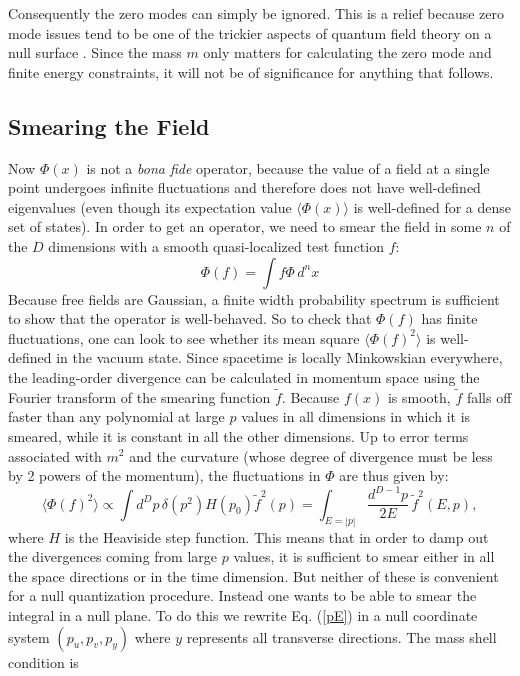 \documentclass[12pt]{article}
\begin{document}
Consequently the zero modes can simply be ignored.  This is a relief because zero mode issues tend to be one of the trickier aspects of quantum field theory on a null surface \cite{burkardt96}.  Since the mass $m$ only matters for calculating the zero mode and finite energy constraints, it will not be of significance for anything that follows.

\subsection{Smearing the Field}\label{smear}

Now $\Phi(x)$ is not a \textit{bona fide} operator, because the value of a field at a single point undergoes infinite fluctuations and therefore does not have well-defined eigenvalues (even though its expectation value $\langle \Phi(x) \rangle$ is well-defined for a dense set of states).  In order to get an operator, we need to smear the field in some $n$ of the $D$ dimensions with a smooth quasi-localized test function $f$:
\begin{equation}
\Phi(f) = \int f \Phi\,d^n x
\end{equation}
Because free fields are Gaussian, a finite width probability spectrum is sufficient to show that the operator is well-behaved.  So to check that $\Phi(f)$ has finite fluctuations, one can look to see whether its mean square $\langle \Phi(f)^2 \rangle$ is well-defined in the vacuum state.  Since spacetime is locally Minkowskian everywhere, the leading-order divergence can be calculated in momentum space using the Fourier transform of the smearing function $\tilde{f}$.
Because $f(x)$ is smooth, $\tilde{f}$ falls off faster than any polynomial at large $p$ values in all dimensions in which it is smeared, while it is constant in all the other dimensions.
  Up to error terms associated with $m^2$ and the curvature (whose degree of divergence must be less by 2 powers of the momentum), the fluctuations in $\Phi$ are thus given by:
\begin{equation}\label{pE}
\langle \Phi(f)^2 \rangle \propto \int d^D p\,\delta(p^2) H(p_0) \tilde{f}^2(p)
= \int_{E = |p|} \frac{d^{D-1}p}{2E}\,\tilde{f}^2(E, p),
\end{equation}
where $H$ is the Heaviside step function.  This means that in order to damp out the divergences coming from large $p$ values, it is sufficient to smear either in all the space directions or in the time dimension.  But neither of these is convenient for a null quantization procedure.  Instead one wants to be able to smear the integral in a null plane.  To do this we rewrite Eq. (\ref{pE}) in a null coordinate system $(p_u, p_v, p_y)$ where $y$ represents all transverse directions.  The mass shell condition is
\end{document}

